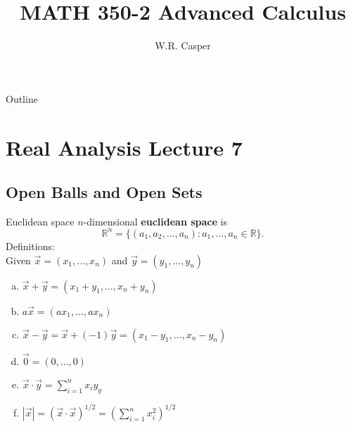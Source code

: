 \documentclass{beamer}
\title{MATH 350-2 Advanced Calculus}
\subtitle
{} %
\author[W.R. Casper] %
{W.R. Casper}
\institute[California State University Fullerton] %
{
  Department of Mathematics\\
  California State University Fullerton}
\begin{document}
\begin{frame}
  \titlepage
\end{frame}

\begin{frame}{Outline}
  \tableofcontents
\end{frame}



\section{Real Analysis Lecture 7}

\subsection{Open Balls and Open Sets}

\begin{frame}{Euclidean space}
\pause
$n$-dimensional \textbf{euclidean space} is
\pause
$$\mathbb{R}^n = \{(a_1,a_2,\dots,a_n): a_1,\dots, a_n\in\mathbb{R}\}.$$
\pause
Definitions:\\
\pause
Given $\vec x = (x_1,\dots, x_n)$ and $\vec y = (y_1,\dots, y_n)$
\begin{enumerate}[(a)]
\pause
\item $\vec x + \vec y = (x_1+y_1,\dots,x_n+y_n)$
\pause
\item $a\vec x = (ax_1,\dots, ax_n)$
\pause
\item $\vec x - \vec y = \vec x + (-1)\vec y = (x_1-y_1,\dots,x_n-y_n)$
\pause
\item $\vec 0 = (0,\dots, 0)$
\pause
\item $\vec x\cdot\vec y = \sum_{i=1}^n x_iy_y$
\pause
\item $|\vec x| = (\vec x\cdot\vec x)^{1/2} = \left(\sum_{i=1}^nx_i^2\right)^{1/2}$
\end{enumerate}
\end{frame}
\end{document}
